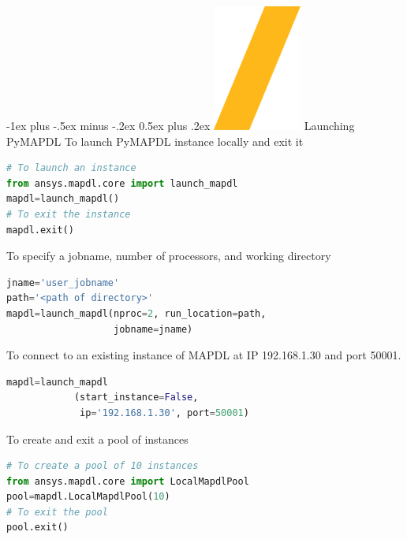 \documentclass[9pt,landscape]{article}
\makeatletter
\renewcommand{\section}{\@startsection{section}{1}{0mm}%
                                {-1ex plus -.5ex minus -.2ex}%
                                {0.5ex plus .2ex}%
                                {\normalfont\large\bfseries}}
\makeatother
\begin{document}
\begin{multicols}{3}
\setlength{\premulticols}{1pt}
\setlength{\postmulticols}{1pt}
\setlength{\multicolsep}{1pt}
\setlength{\columnsep}{2pt}

\section{\includegraphics[height=\fontcharht\font`\S]{slash.png} Launching PyMAPDL}
To launch PyMAPDL instance locally and exit it
\begin{lstlisting}[language=Python]
# To launch an instance
from ansys.mapdl.core import launch_mapdl
mapdl=launch_mapdl()
# To exit the instance
mapdl.exit()
\end{lstlisting}

To specify a jobname, number of processors, and working directory
\begin{lstlisting}[language=Python]
jname='user_jobname'
path='<path of directory>'
mapdl=launch_mapdl(nproc=2, run_location=path,
                   jobname=jname)
\end{lstlisting}

To connect to an existing instance of MAPDL at IP 192.168.1.30 and port 50001.
\begin{lstlisting}[language=Python]
mapdl=launch_mapdl
            (start_instance=False,
             ip='192.168.1.30', port=50001)
\end{lstlisting}
To create and exit a pool of instances
\begin{lstlisting}[language=Python]
# To create a pool of 10 instances
from ansys.mapdl.core import LocalMapdlPool
pool=mapdl.LocalMapdlPool(10)
# To exit the pool
pool.exit()
\end{lstlisting}


\end{multicols}
\end{document}
